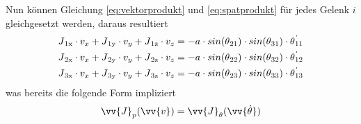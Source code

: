 \documentclass[Bachelor, BMR, ngerman]{twbook}
\begin{document}
    Nun können Gleichung \ref{eq:vektorprodukt} und \ref{eq:spatprodukt} für jedes Gelenk $i$ gleichgesetzt werden, daraus resultiert
    \newline
    \begin{align}
        J\textsubscript{1x} \cdot v_x + J\textsubscript{1y} \cdot v_y + J\textsubscript{1z} \cdot v_z =
        -a \cdot sin(\theta\textsubscript{21}) \cdot sin(\theta\textsubscript{31}) \cdot \dot{\theta\textsubscript{11}} \nonumber \\
        J\textsubscript{2x} \cdot v_x + J\textsubscript{2y} \cdot v_y + J\textsubscript{2z} \cdot v_z =
        -a \cdot sin(\theta\textsubscript{22}) \cdot sin(\theta\textsubscript{32}) \cdot \dot{\theta\textsubscript{12}} \nonumber \\
        J\textsubscript{3x} \cdot v_x + J\textsubscript{3y} \cdot v_y + J\textsubscript{3z} \cdot v_z =
        -a \cdot sin(\theta\textsubscript{23}) \cdot sin(\theta\textsubscript{33}) \cdot \dot{\theta\textsubscript{13}}
        \label{eq:vektor-_und_spatprodukt_gleichgesetzt}
    \end{align}
    \noindent
    was bereits die folgende Form impliziert
    \newline
    \begin{align}
        \vv{J}_p(\vv{v}) = \vv{J}_\theta(\vv{\dot{\theta}})
        \label{eq:jacobi-fertig}
    \end{align}
\end{document}
